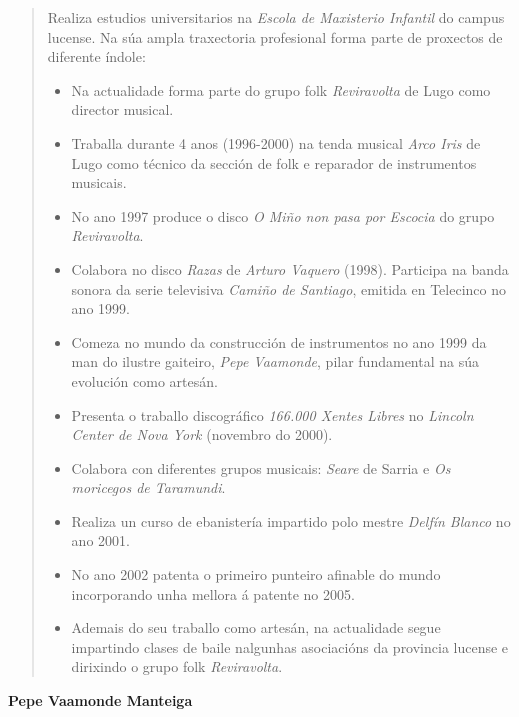 \begin{quotation}
   Realiza estudios universitarios na \textit{Escola de Maxisterio Infantil} do
   campus lucense. Na súa ampla traxectoria profesional forma parte de
   proxectos de diferente índole:

   \begin{itemize}
    \item Na actualidade forma parte do grupo folk \textit{Reviravolta} de Lugo
          como director musical.
    \item Traballa durante 4 anos (1996-2000) na tenda musical
          \textit{Arco Iris} de Lugo como técnico da sección de folk e
          reparador de instrumentos musicais.
    \item No ano 1997 produce o disco \textit{O Miño non pasa por Escocia} do
          grupo \textit{Reviravolta}.
    \item Colabora no disco \textit{Razas} de \textit{Arturo Vaquero} (1998).
          Participa na banda sonora da serie televisiva
          \textit{Camiño de Santiago}, emitida en Telecinco no ano 1999.
    \item Comeza no mundo da construcción de instrumentos no ano 1999 da man do
          ilustre gaiteiro, \textit{Pepe Vaamonde}, pilar fundamental na súa
          evolución como artesán.
    \item Presenta o traballo discográfico \textit{166.000 Xentes Libres} no
          \textit{Lincoln Center de Nova York} (novembro do 2000).
    \item Colabora con diferentes grupos musicais: \textit{Seare} de Sarria e
          \textit{Os moricegos de Taramundi}.
    \item Realiza un curso de ebanistería impartido polo mestre
          \textit{Delfín Blanco} no ano 2001. 
    \item No ano 2002 patenta o primeiro punteiro afinable do mundo
          incorporando unha mellora á patente no 2005.
    \item Ademais do seu traballo como artesán, na actualidade segue impartindo
          clases de baile nalgunhas asociacións da provincia lucense e
          dirixindo o grupo folk \textit{Reviravolta}.
   \end{itemize}
  \end{quotation}

  \textbf{Pepe Vaamonde Manteiga}


